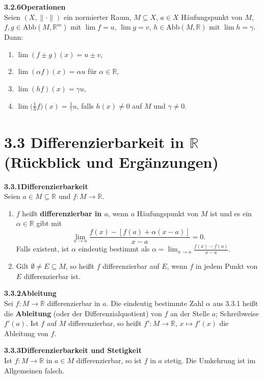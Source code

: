 \documentclass[a4paper,12pt]{article}
\newcommand{\gentry}[3]{%
  \noindent\textbf{#1\quad #2}\nopagebreak\\[0.2em]
  #3\par\smallskip
}
\begin{document}
\gentry{3.2.6}{Operationen}{%
  Seien $(X, \|\cdot\|)$ ein normierter Raum, $M \subseteq X$, $a \in X$
  H\"aufungspunkt von $M$, $f, g \in \mathrm{Abb}(M, \mathbb{R}^m)$ mit
  $\lim f = u$, $\lim g = v$, $h \in \mathrm{Abb}(M, \mathbb{R})$ mit
  $\lim h = \gamma$. Dann:
  \begin{enumerate}[label=(\roman*),topsep=2pt,itemsep=1pt]
    \item $\lim(f \pm g)(x) = u \pm v$,
    \item $\lim(\alpha f)(x) = \alpha u$ f\"ur $\alpha \in \mathbb{R}$,
    \item $\lim(h f)(x) = \gamma u$,
    \item $\lim\bigl(\tfrac{1}{h} f\bigr)(x) = \tfrac{1}{\gamma} u$, falls $h(x) \neq 0$ auf $M$ und $\gamma \neq 0$.
  \end{enumerate}
}

\section*{3.3 \quad Differenzierbarkeit in $\mathbb{R}$ (R\"uckblick und Erg\"anzungen)}

\gentry{3.3.1}{Differenzierbarkeit}{%
  Seien $a \in M \subseteq \mathbb{R}$ und $f : M \to \mathbb{R}$.
  \begin{enumerate}[label=(\roman*),topsep=2pt,itemsep=1pt]
    \item $f$ hei{\ss}t \textbf{differenzierbar in $a$}, wenn $a$ H\"aufungspunkt von $M$ ist
          und es ein $\alpha \in \mathbb{R}$ gibt mit
          \[
            \lim_{x \to a} \frac{f(x) - [f(a) + \alpha(x - a)]}{x - a} = 0.
          \]
          Falls existent, ist $\alpha$ eindeutig bestimmt als
          $\alpha = \lim_{x \to a} \tfrac{f(x) - f(a)}{x - a}$.
    \item Gilt $\emptyset \neq E \subseteq M$, so hei{\ss}t $f$ differenzierbar auf $E$, wenn $f$
          in jedem Punkt von $E$ differenzierbar ist.
  \end{enumerate}
}

\gentry{3.3.2}{Ableitung}{%
  Sei $f : M \to \mathbb{R}$ differenzierbar in $a$.
  Die eindeutig bestimmte Zahl $\alpha$ aus 3.3.1 hei{\ss}t die \textbf{Ableitung} (oder
  der Differenzialquotient) von $f$ an der Stelle $a$; Schreibweise $f'(a)$.
  Ist $f$ auf $M$ differenzierbar, so hei{\ss}t $f' : M \to \mathbb{R}$, $x \mapsto f'(x)$
  die Ableitung von $f$.
}

\gentry{3.3.3}{Differenzierbarkeit und Stetigkeit}{%
  Ist $f : M \to \mathbb{R}$ in $a \in M$ differenzierbar, so ist $f$ in $a$ stetig.
  Die Umkehrung ist im Allgemeinen falsch.
}
\end{document}

